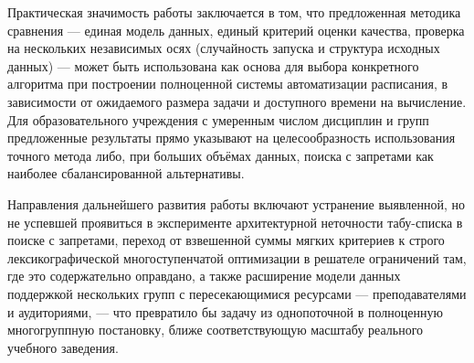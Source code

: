 Практическая значимость работы заключается в том, что предложенная методика сравнения — единая модель данных, единый критерий оценки качества, проверка на нескольких независимых осях (случайность запуска и структура исходных данных) — может быть использована как основа для выбора конкретного алгоритма при построении полноценной системы автоматизации расписания, в зависимости от ожидаемого размера задачи и доступного времени на вычисление. Для образовательного учреждения с умеренным числом дисциплин и групп предложенные результаты прямо указывают на целесообразность использования точного метода либо, при больших объёмах данных, поиска с запретами как наиболее сбалансированной альтернативы.

Направления дальнейшего развития работы включают устранение выявленной, но не успевшей проявиться в эксперименте архитектурной неточности табу-списка в поиске с запретами, переход от взвешенной суммы мягких критериев к строго лексикографической многоступенчатой оптимизации в решателе ограничений там, где это содержательно оправдано, а также расширение модели данных поддержкой нескольких групп с пересекающимися ресурсами — преподавателями и аудиториями, — что превратило бы задачу из однопоточной в полноценную многогруппную постановку, ближе соответствующую масштабу реального учебного заведения.
